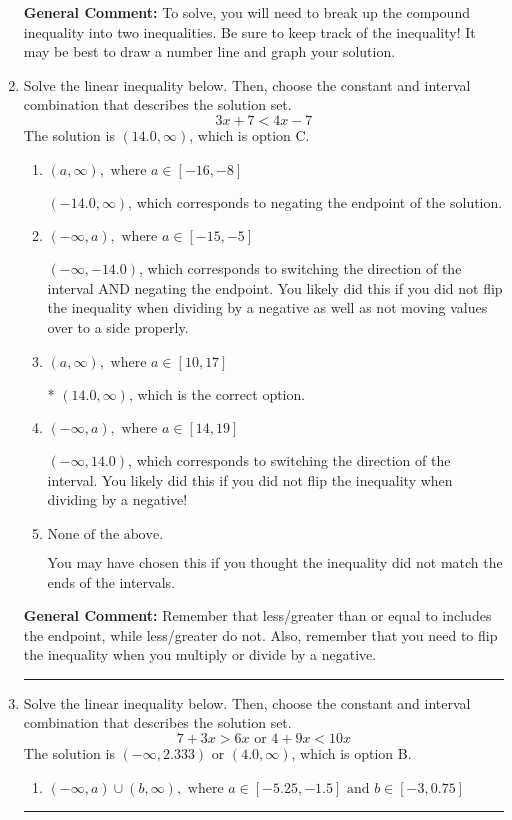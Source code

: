 \documentclass{extbook}[14pt]
\newcommand{\litem}[1]{\item #1

\rule{\textwidth}{0.4pt}}
\begin{document}
\begin{enumerate}
{\begin{enumerate}[label=\Alph*.]
\end{enumerate}

\textbf{General Comment:} To solve, you will need to break up the compound inequality into two inequalities. Be sure to keep track of the inequality! It may be best to draw a number line and graph your solution.
}
\litem{
Solve the linear inequality below. Then, choose the constant and interval combination that describes the solution set.
\[ 3x + 7 < 4x -7 \]The solution is \( (14.0, \infty) \), which is option C.\begin{enumerate}[label=\Alph*.]
\item \( (a, \infty), \text{ where } a \in [-16, -8] \)

 $(-14.0, \infty)$, which corresponds to negating the endpoint of the solution.
\item \( (-\infty, a), \text{ where } a \in [-15, -5] \)

 $(-\infty, -14.0)$, which corresponds to switching the direction of the interval AND negating the endpoint. You likely did this if you did not flip the inequality when dividing by a negative as well as not moving values over to a side properly.
\item \( (a, \infty), \text{ where } a \in [10, 17] \)

* $(14.0, \infty)$, which is the correct option.
\item \( (-\infty, a), \text{ where } a \in [14, 19] \)

 $(-\infty, 14.0)$, which corresponds to switching the direction of the interval. You likely did this if you did not flip the inequality when dividing by a negative!
\item \( \text{None of the above}. \)

You may have chosen this if you thought the inequality did not match the ends of the intervals.
\end{enumerate}

\textbf{General Comment:} Remember that less/greater than or equal to includes the endpoint, while less/greater do not. Also, remember that you need to flip the inequality when you multiply or divide by a negative.
}
\litem{
Solve the linear inequality below. Then, choose the constant and interval combination that describes the solution set.
\[ 7 + 3 x > 6 x \text{ or } 4 + 9 x < 10 x \]The solution is \( (-\infty, 2.333) \text{ or } (4.0, \infty) \), which is option B.\begin{enumerate}[label=\Alph*.]
\item \( (-\infty, a) \cup (b, \infty), \text{ where } a \in [-5.25, -1.5] \text{ and } b \in [-3, 0.75] \)


\end{enumerate}}
\end{enumerate}
\end{document}
